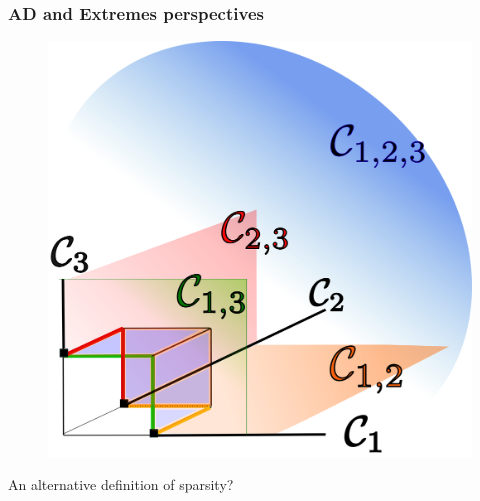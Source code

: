 \documentclass[9pt]{beamer}
\begin{document}

\begin{frame}
\frametitle{AD and Extremes perspectives}

  \begin{figure}
    \centering
    \includegraphics[width=0.4\linewidth]{sourcefigs/cone}
  \end{figure}


An alternative definition of sparsity?
\end{frame}
\end{document}
